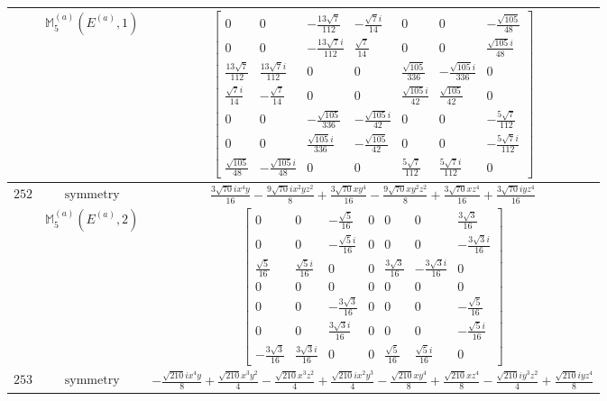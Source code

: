 \documentclass[fleqn,8pt,landscape]{jsarticle}
\begin{document}
\begin{longtable}{ccc}
$  $ & $ \mathbb{M}_{5}^{(a)}(E^{(a)},1) $ & $ \begin{bmatrix} 0 & 0 & - \frac{13 \sqrt{7}}{112} & - \frac{\sqrt{7} i}{14} & 0 & 0 & - \frac{\sqrt{105}}{48} \\ 0 & 0 & - \frac{13 \sqrt{7} i}{112} & \frac{\sqrt{7}}{14} & 0 & 0 & \frac{\sqrt{105} i}{48} \\ \frac{13 \sqrt{7}}{112} & \frac{13 \sqrt{7} i}{112} & 0 & 0 & \frac{\sqrt{105}}{336} & - \frac{\sqrt{105} i}{336} & 0 \\ \frac{\sqrt{7} i}{14} & - \frac{\sqrt{7}}{14} & 0 & 0 & \frac{\sqrt{105} i}{42} & \frac{\sqrt{105}}{42} & 0 \\ 0 & 0 & - \frac{\sqrt{105}}{336} & - \frac{\sqrt{105} i}{42} & 0 & 0 & - \frac{5 \sqrt{7}}{112} \\ 0 & 0 & \frac{\sqrt{105} i}{336} & - \frac{\sqrt{105}}{42} & 0 & 0 & - \frac{5 \sqrt{7} i}{112} \\ \frac{\sqrt{105}}{48} & - \frac{\sqrt{105} i}{48} & 0 & 0 & \frac{5 \sqrt{7}}{112} & \frac{5 \sqrt{7} i}{112} & 0 \end{bmatrix} $ \\ \hline
$ 252 $ & $ \text{symmetry} $ & $ \frac{3 \sqrt{70} i x^{4} y}{16} - \frac{9 \sqrt{70} i x^{2} y z^{2}}{8} + \frac{3 \sqrt{70} x y^{4}}{16} - \frac{9 \sqrt{70} x y^{2} z^{2}}{8} + \frac{3 \sqrt{70} x z^{4}}{16} + \frac{3 \sqrt{70} i y z^{4}}{16} $ \\
$  $ & $ \mathbb{M}_{5}^{(a)}(E^{(a)},2) $ & $ \begin{bmatrix} 0 & 0 & - \frac{\sqrt{5}}{16} & 0 & 0 & 0 & \frac{3 \sqrt{3}}{16} \\ 0 & 0 & - \frac{\sqrt{5} i}{16} & 0 & 0 & 0 & - \frac{3 \sqrt{3} i}{16} \\ \frac{\sqrt{5}}{16} & \frac{\sqrt{5} i}{16} & 0 & 0 & \frac{3 \sqrt{3}}{16} & - \frac{3 \sqrt{3} i}{16} & 0 \\ 0 & 0 & 0 & 0 & 0 & 0 & 0 \\ 0 & 0 & - \frac{3 \sqrt{3}}{16} & 0 & 0 & 0 & - \frac{\sqrt{5}}{16} \\ 0 & 0 & \frac{3 \sqrt{3} i}{16} & 0 & 0 & 0 & - \frac{\sqrt{5} i}{16} \\ - \frac{3 \sqrt{3}}{16} & \frac{3 \sqrt{3} i}{16} & 0 & 0 & \frac{\sqrt{5}}{16} & \frac{\sqrt{5} i}{16} & 0 \end{bmatrix} $ \\ \hline
$ 253 $ & $ \text{symmetry} $ & $ - \frac{\sqrt{210} i x^{4} y}{8} + \frac{\sqrt{210} x^{3} y^{2}}{4} - \frac{\sqrt{210} x^{3} z^{2}}{4} + \frac{\sqrt{210} i x^{2} y^{3}}{4} - \frac{\sqrt{210} x y^{4}}{8} + \frac{\sqrt{210} x z^{4}}{8} - \frac{\sqrt{210} i y^{3} z^{2}}{4} + \frac{\sqrt{210} i y z^{4}}{8} $ \\

\end{longtable}
\end{document}
